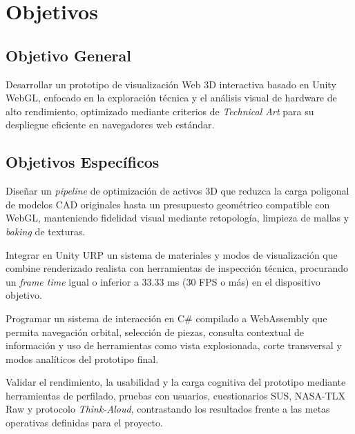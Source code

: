 \section{Objetivos}

\subsection{Objetivo General}
Desarrollar un prototipo de visualizaci\'on Web 3D interactiva basado en Unity WebGL, enfocado en la exploraci\'on t\'ecnica y el an\'alisis visual de hardware de alto rendimiento, optimizado mediante criterios de \textit{Technical Art} para su despliegue eficiente en navegadores web est\'andar.

\subsection{Objetivos Espec\'ificos}

Dise\~nar un \textit{pipeline} de optimizaci\'on de activos 3D que reduzca la carga poligonal de modelos CAD originales hasta un presupuesto geom\'etrico compatible con WebGL, manteniendo fidelidad visual mediante retopolog\'ia, limpieza de mallas y \textit{baking} de texturas.

Integrar en Unity URP un sistema de materiales y modos de visualizaci\'on que combine renderizado realista con herramientas de inspecci\'on t\'ecnica, procurando un \textit{frame time} igual o inferior a 33.33 ms (30 FPS o m\'as) en el dispositivo objetivo.

Programar un sistema de interacci\'on en C\# compilado a WebAssembly que permita navegaci\'on orbital, selecci\'on de piezas, consulta contextual de informaci\'on y uso de herramientas como vista explosionada, corte transversal y modos anal\'iticos del prototipo final.

Validar el rendimiento, la usabilidad y la carga cognitiva del prototipo mediante herramientas de perfilado, pruebas con usuarios, cuestionarios SUS, NASA-TLX Raw y protocolo \textit{Think-Aloud}, contrastando los resultados frente a las metas operativas definidas para el proyecto.

\newpage
